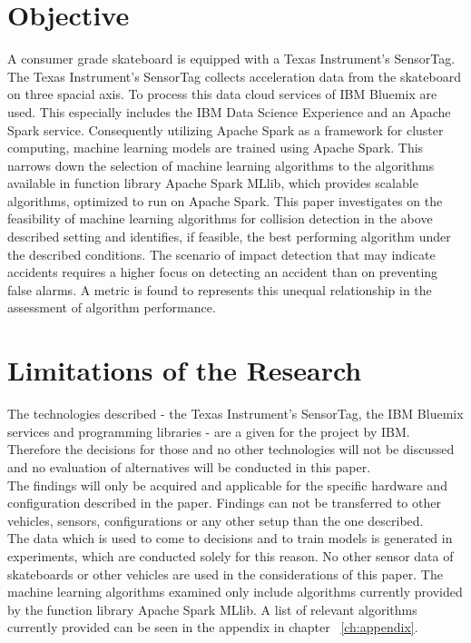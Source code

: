 \section{Objective}
A consumer grade skateboard is equipped with a Texas Instrument’s SensorTag. The Texas Instrument’s SensorTag collects acceleration data from the skateboard on three spacial axis. To process this data cloud services of IBM Bluemix are used. This especially includes the IBM Data Science Experience and an Apache Spark service. Consequently utilizing Apache Spark as a framework for cluster computing, machine learning models are trained using Apache Spark. This narrows down the selection of machine learning algorithms to the algorithms available in function library Apache Spark MLlib, which provides scalable algorithms, optimized to run on Apache Spark. 
\newline
This paper investigates on the feasibility of machine learning algorithms for collision detection in the above described setting and identifies, if feasible, the best performing algorithm under the described conditions.   \newline
The  scenario of impact detection that may indicate accidents requires a higher focus on detecting an accident than on preventing false alarms. A metric is found to represents this unequal relationship in the assessment of algorithm performance.

\section{Limitations of the Research}
The technologies described - the Texas Instrument’s SensorTag, the IBM Bluemix services and programming libraries - are a given for the project by IBM. Therefore the decisions for those and no other technologies will not be discussed and no evaluation of alternatives will be conducted in this paper.
\\
The findings will only be acquired and applicable for the specific hardware and configuration described in the paper. Findings can not be transferred to other vehicles, sensors, configurations or any other setup than the one described.
\\
The data which is used to come to decisions and to train models is generated in experiments, which are conducted solely for this reason. No other sensor data of skateboards or other vehicles are used in the considerations of this paper.
The machine learning algorithms examined only include algorithms currently provided by the function library Apache Spark MLlib. A list of relevant algorithms currently provided can be seen in the appendix in chapter ~\ref{ch:appendix}.

